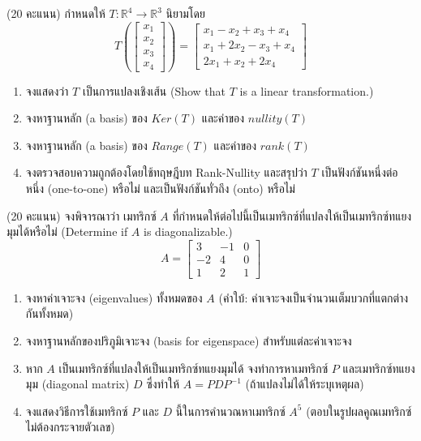 \documentclass[12pt, a4paper]{exam}
\begin{document}
\begin{questions}
\question (20 คะแนน) กําหนดให้ $T : \mathbb{R}^4 \to \mathbb{R}^3$ นิยามโดย
\[ T\left(\begin{bmatrix} x_1 \\ x_2 \\ x_3 \\ x_4 \end{bmatrix}\right) = \begin{bmatrix} x_1 - x_2 + x_3 + x_4 \\ x_1 + 2x_2 - x_3 + x_4 \\ 2x_1 + x_2 + 2x_4 \end{bmatrix} \]
\begin{enumerate}[label=\textbf{2.\arabic*)}]
    \item จงแสดงว่า $T$ เป็นการแปลงเชิงเส้น (Show that $T$ is a linear transformation.)
    \item จงหาฐานหลัก (a basis) ของ $Ker(T)$ และค่าของ $nullity(T)$
    \item จงหาฐานหลัก (a basis) ของ $Range(T)$ และค่าของ $rank(T)$
    \item จงตรวจสอบความถูกต้องโดยใช้ทฤษฎีบท Rank-Nullity และสรุปว่า $T$ เป็นฟังก์ชันหนึ่งต่อหนึ่ง (one-to-one) \mbox{หรือไม่} และเป็นฟังก์ชันทั่วถึง (onto) \mbox{หรือไม่}
\end{enumerate}
\newpage

\question (20 คะแนน) จงพิจารณาว่า เมทริกซ์ $A$ ที่กำหนดให้ต่อไปนี้เป็นเมทริกซ์ที่แปลงให้เป็นเมทริกซ์\mbox{ทแยงมุม}ได้\mbox{หรือไม่} (Determine if $A$ is diagonalizable.)
\[ A = \begin{bmatrix} 3 & -1 & 0 \\ -2 & 4 & 0 \\ 1 & 2 & 1 \end{bmatrix} \]
\begin{enumerate}[label=\textbf{3.\arabic*)}]
    \item จงหาค่าเจาะจง (eigenvalues) ทั้งหมดของ $A$ (คำใบ้: ค่าเจาะจงเป็นจำนวนเต็มบวกที่แตกต่างกันทั้งหมด)
    \item จงหาฐานหลักของปริภูมิเจาะจง (basis for eigenspace) สำหรับแต่ละค่าเจาะจง
    \item หาก $A$ เป็นเมทริกซ์ที่แปลงให้เป็นเมทริกซ์\mbox{ทแยงมุม}ได้ จงทำการหาเมทริกซ์ $P$ และเมทริกซ์\mbox{ทแยงมุม} (diagonal matrix) $D$ ซึ่งทำให้ $A = PDP^{-1}$ (ถ้าแปลงไม่ได้ให้ระบุเหตุผล)
    \item จงแสดงวิธีการใช้เมทริกซ์ $P$ และ $D$ นี้ในการคำนวณหาเมทริกซ์ $A^5$ (ตอบในรูปผลคูณเมทริกซ์ ไม่ต้องกระจายตัวเลข)
\end{enumerate}
\newpage


\end{questions}
\end{document}
